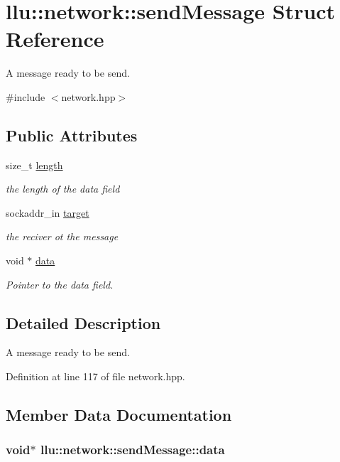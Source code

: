 \hypertarget{structllu_1_1network_1_1send_message}{\section{llu\+:\+:network\+:\+:send\+Message Struct Reference}
\label{structllu_1_1network_1_1send_message}
}


A message ready to be send.  




{\ttfamily \#include $<$network.\+hpp$>$}

\subsection*{Public Attributes}
\begin{DoxyCompactItemize}
\item 
size\+\_\+t \hyperlink{structllu_1_1network_1_1send_message_ae582fa0aa75b342c31c59ce2410eba59}{length}
\begin{DoxyCompactList}\small\item\em the length of the data field \end{DoxyCompactList}\item 
sockaddr\+\_\+in \hyperlink{structllu_1_1network_1_1send_message_ad25654cbeb601ad6fef4232e950b291c}{target}
\begin{DoxyCompactList}\small\item\em the reciver ot the message \end{DoxyCompactList}\item 
void $\ast$ \hyperlink{structllu_1_1network_1_1send_message_a4f4121bce7936e551f99dd9c2e0e74b2}{data}
\begin{DoxyCompactList}\small\item\em Pointer to the data field. \end{DoxyCompactList}\end{DoxyCompactItemize}


\subsection{Detailed Description}
A message ready to be send. 

Definition at line 117 of file network.\+hpp.



\subsection{Member Data Documentation}
\hypertarget{structllu_1_1network_1_1send_message_a4f4121bce7936e551f99dd9c2e0e74b2}{
\subsubsection[{data}]{\setlength{\rightskip}{0pt plus 5cm}void$\ast$ llu\+::network\+::send\+Message\+::data}}\label{structllu_1_1network_1_1send_message_a4f4121bce7936e551f99dd9c2e0e74b2}


